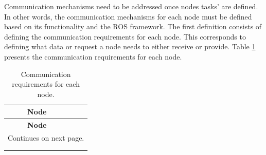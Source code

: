 \documentclass{article}
\begin{document}
Communication mechanisms need to be addressed once nodes tasks' are defined. In other words, the communication mechanisms for each node must be defined based on its functionality and the ROS framework. The first definition consists of defining the communication requirements for each node. This corresponds to defining what data or request a node needs to either receive or provide. Table \ref{tab:node_requirements} presents the communication requirements for each node.

\begin{singlespace}
    \begin{longtable}{|l|>{\baselineskip=10pt}p{10cm}|}
        \hline \multicolumn{1}{|c|}{\textbf{Node}} & \multicolumn{1}{c|}{\textbf{Requirements}} \\ \hline
        \endfirsthead
    
        \hline \multicolumn{1}{|c|}{\textbf{Node}} & \multicolumn{1}{c|}{\textbf{Requirements}} \\ \hline
        \endhead
        
        \hline \multicolumn{2}{|c|}{Continues on next page.} \\ \hline
        \endfoot
        
        \caption{Communication requirements for each node.} \label{tab:node_requirements} \\
        \endlastfoot
        

\end{longtable}
\end{singlespace}
\end{document}
